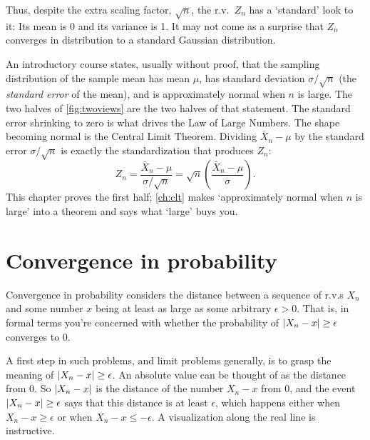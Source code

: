 Thus, despite the extra scaling factor, $\sqrt{n}$, the r.v.\ $Z_n$ has a `standard' look to it: Its mean is 0 and its variance is 1.
It may not come as a surprise that $Z_n$ converges in distribution to a standard Gaussian distribution.

\begin{bridge}
An introductory course states, usually without proof, that the sampling distribution of the sample mean has mean $\mu$, has standard deviation $\sigma/\sqrt{n}$ (the \textit{standard error} of the mean), and is approximately normal when $n$ is large.
The two halves of \cref{fig:twoviews} are the two halves of that statement.
The standard error shrinking to zero is what drives the Law of Large Numbers.
The shape becoming normal is the Central Limit Theorem.
Dividing $\bar{X}_n - \mu$ by the standard error $\sigma/\sqrt{n}$ is exactly the standardization that produces $Z_n$:
\[
Z_n = \frac{\bar{X}_n - \mu}{\sigma/\sqrt{n}} = \sqrt{n} \left( \frac{\bar{X}_n - \mu}{\sigma} \right).
\]
This chapter proves the first half; \cref{ch:clt} makes `approximately normal when $n$ is large' into a theorem and says what `large' buys you.
\end{bridge}

\section{Convergence in probability}
\label{sec:conv-prob}

Convergence in probability considers the distance between a sequence of r.v.s $X_n$ and some number $x$ being at least as large as some arbitrary $\epsilon > 0$.
That is, in formal terms you're concerned with whether the probability of $\lvert X_n - x\rvert \geq \epsilon$ converges to 0.

A first step in such problems, and limit problems generally, is to grasp the meaning of $\lvert X_n - x\rvert \geq \epsilon$.
An absolute value can be thought of as the distance from 0.
So $\lvert X_n - x\rvert$ is the distance of the number $X_n - x$ from 0, and the event $\lvert X_n - x\rvert \geq \epsilon$ says that this distance is at least $\epsilon$, which happens either when $X_n - x \geq \epsilon$ or when $X_n - x \leq - \epsilon$.
A visualization along the real line is instructive.

\begin{center}
\end{center}

